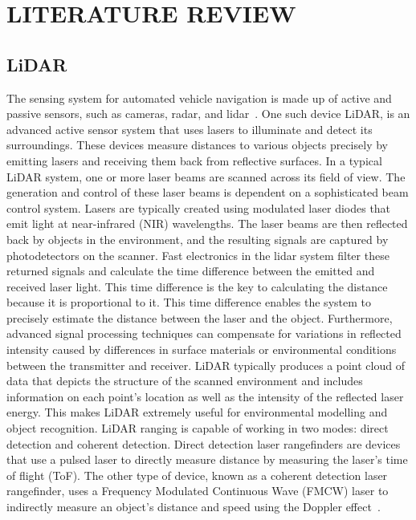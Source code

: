 \section{LITERATURE REVIEW}
\label{sec:literature_review}
\subsection{LiDAR}
\label{subsec:lidar}
The sensing system for automated vehicle navigation is made up of active and passive sensors, such as cameras, radar, and lidar~\cite{lidar}.
One such device LiDAR, is an advanced active sensor system that uses lasers to illuminate 
and detect its surroundings. These devices measure distances to various objects precisely 
by emitting lasers and receiving them back from reflective surfaces. 
In a typical LiDAR system, one or more laser beams are scanned across its field of view. 
The generation and control of these laser beams is dependent on a sophisticated beam control system.
Lasers are typically created using modulated laser diodes that emit light at near-infrared (NIR) wavelengths. 
The laser beams are then reflected back by objects in the environment, and the resulting signals are captured by photodetectors on the scanner. Fast electronics in the lidar system filter these returned signals and calculate the time difference between the emitted and received laser light. 
This time difference is the key to calculating the distance because it is proportional to it. 
This time difference enables the system to precisely estimate the distance between the laser and the object. 
Furthermore, advanced signal processing techniques can compensate for variations 
in reflected intensity caused by differences in surface materials or environmental conditions 
between the transmitter and receiver. 
LiDAR typically produces a point cloud of data that depicts the structure of the scanned environment 
and includes information on each point's location as well as the intensity of the reflected laser energy. 
This makes LiDAR extremely useful for environmental modelling and object recognition.
LiDAR ranging is capable of working in two modes: direct detection and coherent detection. 
Direct detection laser rangefinders are devices that use a pulsed laser 
to directly measure distance by measuring the laser's time of flight (ToF). 
The other type of device, known as a coherent detection laser rangefinder, 
uses a Frequency Modulated Continuous Wave (FMCW) laser 
to indirectly measure an object's distance and speed using the Doppler effect~\cite{lidarintro}. 

